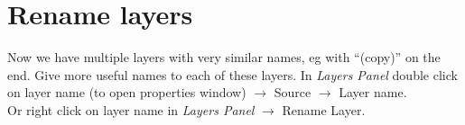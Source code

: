 \section{Rename layers}

Now we have multiple layers with very similar names, eg with “(copy)” on the end. Give more useful names to each of these layers. In \textit{Layers Panel} double click on layer name (to open properties window) $\rightarrow$ Source $\rightarrow$ Layer name.\\

Or right click on layer name in \textit{Layers Panel} $\rightarrow$ Rename Layer.
